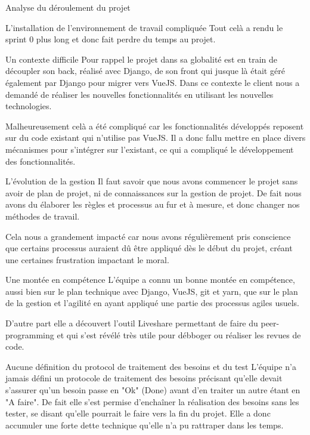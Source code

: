 \documentclass[]{article}
\begin{document}
{\begin{section}{Analyse du déroulement du projet}
\begin{subsection}{L'installation de l'environnement de travail compliquée}
     Tout celà a rendu le sprint 0 plus long et donc fait perdre du temps au projet.
 \end{subsection}

 \begin{subsection}{Un contexte difficile}
     Pour rappel le projet dans sa globalité est en train de découpler son back, réalisé avec Django, de son front qui jusque là était géré également par Django pour migrer vers VueJS. Dans ce contexte le client nous a demandé de réaliser les nouvelles fonctionnalités en utilisant les nouvelles technologies.

     Malheureusement celà a été compliqué car les fonctionnalités développés reposent sur du code existant qui n'utilise pas VueJS. Il a donc fallu mettre en place divers mécanismes pour s'intégrer sur l'existant, ce qui a compliqué le développement des fonctionnalités.
 \end{subsection}

 \begin{subsection}{L'évolution de la gestion}
    Il faut savoir que nous avons commencer le projet sans avoir de plan de projet, ni de connaissances sur la gestion de projet. De fait nous avons du élaborer les règles et processus au fur et à mesure, et donc changer nos méthodes de travail. 
    
    Cela nous a grandement impacté car nous avons régulièrement pris conscience que certains processus auraient dû être appliqué dès le début du projet, créant une certaines frustration impactant le moral.
 \end{subsection}

 \begin{subsection}{Une montée en compétence}
     L'équipe a connu un bonne montée en compétence, aussi bien sur le plan technique avec Django, VueJS, git et yarn, que sur le plan de la gestion et l'agilité en ayant appliqué une partie des processus agiles usuels.

     D'autre part elle a découvert l'outil Liveshare permettant de faire du peer-programming et qui s'est révélé très utile pour débboger ou réaliser les revues de code.
 \end{subsection}

 \newpage

 \begin{subsection}{Aucune définition du protocol de traitement des besoins et du test}
     L'équipe n'a jamais défini un protocole de traitement des besoins précisant qu'elle devait s'assurer qu'un besoin passe en "Ok" (Done) avant d'en traiter un autre étant en "A faire". De fait elle s'est permise d'enchaîner la réalisation des besoins sans les tester, se disant qu'elle pourrait le faire vers la fin du projet. Elle a donc accumuler une forte dette technique qu'elle n'a pu rattraper dans les temps.


\end{subsection}
\end{section}}
\end{document}
